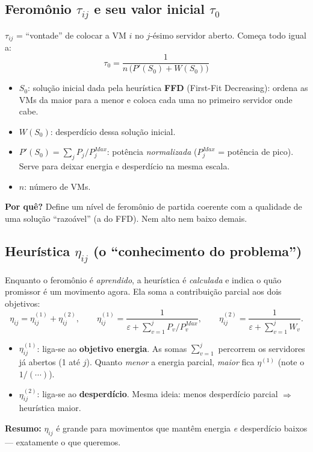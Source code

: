 \documentclass[11pt]{article}
\newcommand{\var}[1]{\textcolor{azul}{$#1$}}
\begin{document}
\subsection{Feromônio \texorpdfstring{$\tau_{ij}$}{tau} e seu valor inicial \texorpdfstring{$\tau_0$}{tau0}}
\var{\tau_{ij}} = ``vontade'' de colocar a VM $i$ no $j$-ésimo servidor aberto.
Começa todo igual a:
\[
\tau_0=\frac{1}{n\,\big(P'(S_0)+W(S_0)\big)}
\]
\begin{itemize}[leftmargin=1.4em,itemsep=1pt]
  \item \var{S_0}: solução inicial dada pela heurística \textbf{FFD}
  (First-Fit Decreasing): ordena as VMs da maior para a menor e coloca cada uma
  no primeiro servidor onde cabe.
  \item \var{W(S_0)}: desperdício dessa solução inicial.
  \item \var{P'(S_0)=\sum_j P_j/P^{Max}_j}: potência \emph{normalizada}
  ($P^{Max}_j$ = potência de pico). Serve para deixar energia e desperdício na
  mesma escala.
  \item \var{n}: número de VMs.
\end{itemize}
\begin{ideia}
\textbf{Por quê?} Define um nível de feromônio de partida coerente com a
qualidade de uma solução ``razoável'' (a do FFD). Nem alto nem baixo demais.
\end{ideia}

\subsection{Heurística \texorpdfstring{$\eta_{ij}$}{eta} (o ``conhecimento do problema'')}
Enquanto o feromônio é \emph{aprendido}, a heurística é \emph{calculada} e
indica o quão promissor é um movimento agora. Ela soma a contribuição parcial
aos dois objetivos:
\[
\eta_{ij}=\eta_{ij}^{(1)}+\eta_{ij}^{(2)},\qquad
\eta_{ij}^{(1)}=\frac{1}{\varepsilon+\sum_{v=1}^{j}P_v/P^{Max}_v},\qquad
\eta_{ij}^{(2)}=\frac{1}{\varepsilon+\sum_{v=1}^{j}W_v}.
\]
\begin{itemize}[leftmargin=1.4em,itemsep=1pt]
  \item \var{\eta_{ij}^{(1)}}: liga-se ao \textbf{objetivo energia}. As somas
  $\sum_{v=1}^{j}$ percorrem os servidores já abertos (1 até $j$). Quanto
  \emph{menor} a energia parcial, \emph{maior} fica $\eta^{(1)}$ (note o $1/(\cdots)$).
  \item \var{\eta_{ij}^{(2)}}: liga-se ao \textbf{desperdício}. Mesma ideia: menos
  desperdício parcial $\Rightarrow$ heurística maior.
\end{itemize}
\begin{ideia}
\textbf{Resumo:} $\eta_{ij}$ é grande para movimentos que mantêm energia
\emph{e} desperdício baixos — exatamente o que queremos.
\end{ideia}
\end{document}
